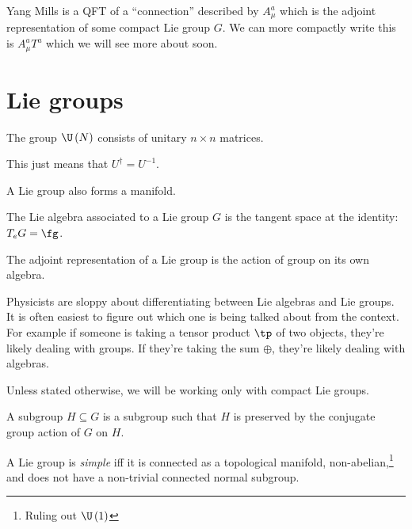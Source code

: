 \documentclass{booc}
\begin{document}
Yang Mills is a QFT of a ``connection'' described
by $A_\mu^a$ which is the adjoint representation of some compact Lie group $G$.
We can more compactly write this is $A_\mu^a T^a$ which we will see more about soon.

\section{Lie groups}

\begin{defn}
The group $\U\left( N \right)$ consists
of unitary $n\times n$ matrices. 
\end{defn}

This just means that $U^\dag = U^{-1}$.

\begin{prop}
A Lie group also forms a manifold. 
\end{prop}

\begin{defn}
The Lie algebra associated to a Lie group $G$
is the tangent space at the identity:
$T_e G = \fg$.
\end{defn}

\begin{defn}
The adjoint representation of a Lie group is 
the action of group on its own algebra.
\end{defn}

\begin{rmk}
Physicists are sloppy about differentiating between
Lie algebras and Lie groups. 
It is often easiest to figure out which one is being talked about
from the context. 
For example if someone is taking a tensor product $\tp$ of two
objects, they're likely dealing with groups.
If they're taking the sum $\oplus$, they're likely dealing with algebras.
\end{rmk}

Unless stated otherwise, we will be working only with compact Lie groups.


\begin{defn}
A subgroup $H \subseteq G$ is a subgroup such that $H$ is preserved by
the conjugate group action of $G$ on $H$.
\end{defn}

\begin{defn}
A Lie group is \emph{simple} iff
it is connected as a topological manifold, non-abelian,\footnote{
Ruling out $\U\left( 1 \right)$}
and does not have a non-trivial connected normal subgroup.
\end{defn}
\end{document}
